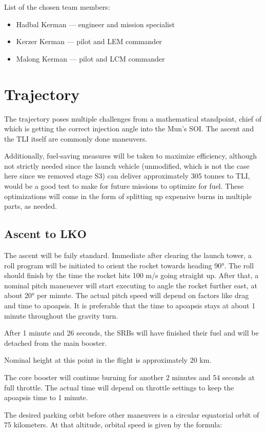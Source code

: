 \documentclass[11pt, a4paper]{article}
\begin{document}
List of the chosen team members:
\begin{itemize}
\item{Hadbal Kerman} --- engineer and mission specialist
\item{Kerzer Kerman} --- pilot and LEM commander
\item{Malong Kerman} --- pilot and LCM commander
\end{itemize}

\section{Trajectory}

The trajectory poses multiple challenges from a mathematical
standpoint, chief of which is getting the correct injection angle into
the Mun's SOI. The ascent and the TLI itself are commonly done
maneuvers.

Additionally, fuel-saving measures will be taken to maximize
efficiency, although not strictly needed since the launch vehicle
(unmodified, which is not the case here since we removed stage S3) can
deliver approximately 305 tonnes to TLI, would be a good test to make
for future missions to optimize for fuel. These optimizations will
come in the form of splitting up expensive burns in multiple parts, as
needed.
\subsection{Ascent to LKO}
The ascent will be faily standard. Immediate after clearing the launch
tower, a roll program will be initiated to orient the rocket towards
heading \ang{90}. The roll should finish by the time the rocket hits
100 m/s going straight up. After that, a nominal pitch maneuever will
start executing to angle the rocket further east, at about \ang{20}
per minute. The actual pitch speed will depend on factors like drag
and time to apoapsis. It is preferable that the time to apoapsis stays
at about 1 minute throughout the gravity turn.

After 1 minute and 26 seconds, the SRBs will have finished their fuel
and will be detached from the main booster.

Nominal height at this point in the flight is approximately 20 km.

The core booster will continue burning for another 2 minutes and 54
seconds at full throttle. The actual time will depend on throttle
settings to keep the apoapsis time to 1 minute.

The desired parking orbit before other maneuvers is a circular
equatorial orbit of 75 kilometers. At that altitude, orbital speed is
given by the formula:
\end{document}
